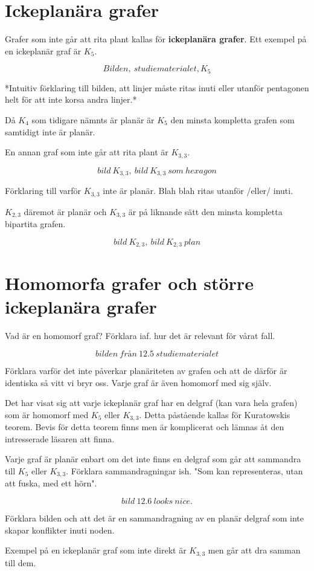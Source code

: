 \documentclass[a4paper,11pt]{article}
\begin{document}
\section*{Ickeplanära grafer}

Grafer som inte går att rita plant kallas för \textbf{ickeplanära grafer}. Ett exempel på en ickeplanär graf är $K_5$.

$$Bilden,\ studiematerialet, K_5$$

*Intuitiv förklaring till bilden, att linjer måste ritas inuti eller utanför pentagonen helt för att inte korsa andra linjer.*

Då $K_4$ som tidigare nämnts är planär är $K_5$ den minsta kompletta grafen som samtidigt inte är planär.

En annan graf som inte går att rita plant är $K_{3,3}$.

$$bild\ K_{3,3},\ bild\ K_{3,3}\ som\ hexagon$$

Förklaring till varför $K_{3,3}$ inte är planär. Blah blah ritas utanför /eller/ inuti.

$K_{2,3}$ däremot är planär och $K_{3,3}$ är på liknande sätt den minsta kompletta bipartita grafen. 

$$bild\ K_{2,3},\ bild\ K_{2,3}\ plan$$

\section*{Homomorfa grafer och större ickeplanära grafer}

Vad är en homomorf graf? Förklara iaf. hur det är relevant för vårat fall.

$$bilden\ från\ 12.5\ studiematerialet$$

Förklara varför det inte påverkar planäriteten av grafen och att de därför är identiska så vitt vi bryr oss. Varje graf är även homomorf med sig själv.

Det har visat sig att varje ickeplanär graf har en delgraf (kan vara hela grafen) som är homomorf med $K_{5}$ eller $K_{3,3}$. Detta påstående kallas för Kuratowskis teorem. Bevis för detta teorem finns men är komplicerat och lämnas åt den intresserade läsaren att finna.

Varje graf är planär enbart om det inte finns en delgraf som går att sammandra till $K_5$ eller $K_{3,3}$. Förklara sammandragningar ish. "Som kan representeras, utan att fuska\texttrademark, med ett hörn".

$$bild\ 12.6\ looks\ nice.$$

Förklara bilden och att det är en sammandragning av en planär delgraf som inte skapar konflikter inuti noden.

Exempel på en ickeplanär graf som inte direkt är $K_{3,3}$ men går att dra samman till dem.
\end{document}
